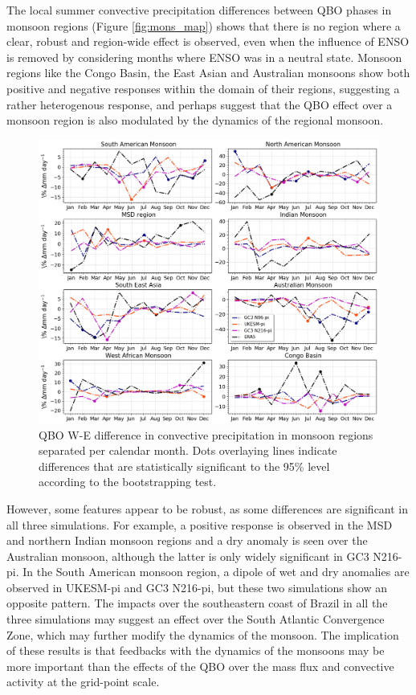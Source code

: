 The local summer convective precipitation differences between QBO phases in monsoon regions (Figure \ref{fig:mons_map}) shows that there is no region where a clear, robust and region-wide effect is observed, even when the influence of ENSO is removed by considering months where ENSO was in a neutral state. Monsoon regions like the Congo Basin, the East Asian and Australian monsoons show both positive and negative responses within the domain of their regions, suggesting a rather heterogenous response, and perhaps suggest that the QBO effect over a monsoon region is also modulated by the dynamics of the regional monsoon. 


\begin{figure}[b!]
\centering
 \includegraphics[width=\linewidth]{figures/mons_init_conv_prcompari.png}
\caption[Impacts of the QBO in the seasonal cycle of monsoon regions.]{QBO W-E difference in convective precipitation in monsoon regions separated per calendar month. Dots overlaying lines indicate differences that are statistically significant to the 95\% level according to the bootstrapping test.}
\label{fig:mons_convpr}
\end{figure}

However, some features appear to be robust, as some differences are significant in all three simulations. For example, a positive response is observed in the MSD and northern Indian monsoon regions and a dry anomaly is seen over the Australian monsoon, although the latter is only widely significant in GC3 N216-pi. 
In the South American monsoon region, a dipole of wet and dry anomalies are observed in UKESM-pi and GC3 N216-pi, but these two simulations show an opposite pattern. 
The impacts over the southeastern coast of Brazil in all the three simulations may suggest an effect over the South Atlantic Convergence Zone, which may further modify the dynamics of the monsoon. 
The implication of these results is that feedbacks with the dynamics of the monsoons may be more important than the effects of the QBO over the mass flux and convective activity at the grid-point scale. 



